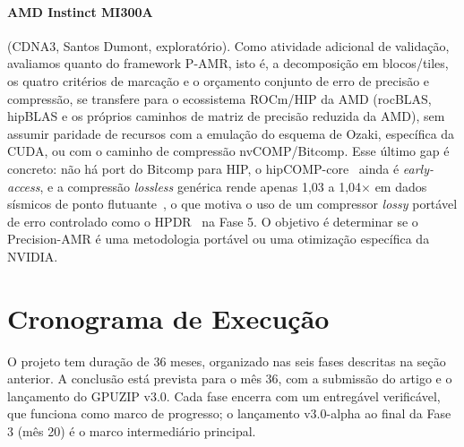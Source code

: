 \documentclass[12pt,a4paper]{article}
\newcommand{\pamr}{P\nobreakdash-AMR}
\begin{document}
\paragraph{AMD Instinct MI300A} (CDNA3, Santos Dumont, exploratório). Como
atividade adicional de validação, avaliamos quanto do framework \pamr{},
isto é, a decomposição em blocos/tiles, os quatro critérios de marcação e o
orçamento conjunto de erro de precisão e compressão, se transfere para o
ecossistema ROCm/HIP da AMD (rocBLAS, hipBLAS e os próprios caminhos de
matriz de precisão reduzida da AMD), sem assumir paridade de recursos com a
emulação do esquema de Ozaki, específica da CUDA, ou com o caminho de
compressão nvCOMP/Bitcomp. Esse último gap é concreto: não há port do
Bitcomp para HIP, o hipCOMP-core~\cite{hipcompcore} ainda é
\emph{early-access}, e a compressão \emph{lossless} genérica rende apenas
1,03 a 1,04$\times$ em dados sísmicos de ponto
flutuante~\cite{kunas2026amdcompression}, o que motiva o uso de um
compressor \emph{lossy} portável de erro controlado como o
HPDR~\cite{chen2025hpdr} na Fase 5. O objetivo é determinar se o
Precision-AMR é uma metodologia portável ou uma otimização específica da
NVIDIA.

\section{Cronograma de Execução}

O projeto tem duração de 36 meses, organizado nas seis fases descritas na
seção anterior. A conclusão está prevista para o mês 36, com a submissão do
artigo e o lançamento do GPUZIP v3.0. Cada fase encerra com um entregável
verificável, que funciona como marco de progresso; o lançamento
v3.0-alpha ao final da Fase 3 (mês 20) é o marco intermediário principal.
\end{document}
